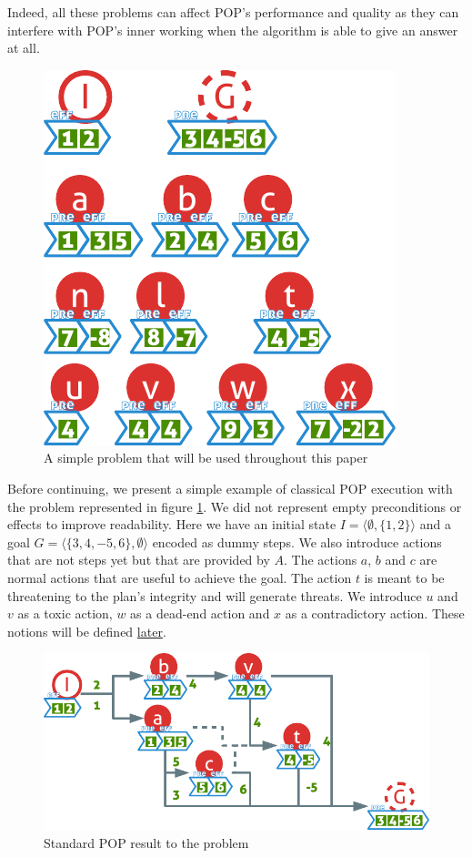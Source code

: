 \documentclass[]{article}
\begin{document}
Indeed, all these problems can affect POP's performance and quality as
they can interfere with POP's inner working when the algorithm is able
to give an answer at all.

\begin{figure}[htbp]
\centering
\includegraphics{graphics/problem.pdf}
\caption{A simple problem that will be used throughout this
paper\label{fig:problem}}
\end{figure}

Before continuing, we present a simple example of classical POP
execution with the problem represented in figure \ref{fig:problem}. We
did not represent empty preconditions or effects to improve readability.
Here we have an initial state
\(I = \langle \emptyset , \{ 1, 2 \} \rangle\) and a goal
\(G = \langle \{ 3, 4, -5, 6 \}, \emptyset \rangle\) encoded as dummy
steps. We also introduce actions that are not steps yet but that are
provided by \(A\). The actions \(a\), \(b\) and \(c\) are normal actions
that are useful to achieve the goal. The action \(t\) is meant to be
threatening to the plan's integrity and will generate threats. We
introduce \(u\) and \(v\) as a toxic action, \(w\) as a dead-end action
and \(x\) as a contradictory action. These notions will be defined
\protect\hyperlink{defects}{later}.

\begin{figure}[htbp]
\centering
\includegraphics{graphics/pop.pdf}
\caption{Standard POP result to the problem\label{fig:pop}}
\end{figure}
\end{document}
